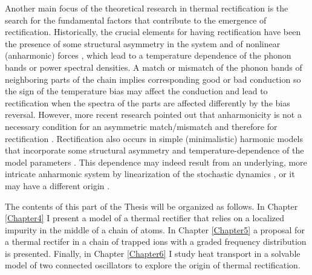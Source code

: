 Another main focus of the theoretical research in thermal rectification is the search for the fundamental factors that contribute to the emergence of rectification. Historically, the crucial elements for having rectification have been the presence of some structural asymmetry in the system and of nonlinear (anharmonic) forces \cite{Zeng2008,Katz2016,Li2008,Hu2006,Benenti2016,Li2012,Segal2005,Segal2005b}, which lead to a temperature dependence of the phonon bands or power spectral densities. A match or mismatch of the phonon bands of neighboring parts of the chain implies corresponding good or bad conduction so the
sign of the temperature bias may affect the conduction and lead to rectification when the spectra of the parts are affected differently by the bias reversal. However, more recent research pointed out that anharmonicity is not a necessary condition for an asymmetric match/mismatch and therefore for rectification \cite{Pereira2017}. Rectification also occurs in simple (minimalistic) harmonic models that incorporate some structural asymmetry and temperature-dependence of the model parameters \cite{Pereira2017}. This dependence may indeed result from an underlying, more intricate  anharmonic system by linearization of the stochastic dynamics \cite{Pereira2017,Pereira2019}, or it may have a different origin \cite{Simon2019}.


The contents of this part of the Thesis will be organized as follows. In Chapter \ref{Chapter4} I present a model of a thermal rectifier that relies on a localized impurity in the middle of a chain of atoms. In Chapter \ref{Chapter5} a proposal for a thermal rectifer in a chain of trapped ions with a graded frequency distribution is presented. Finally, in Chapter \ref{Chapter6} I study heat transport in a solvable model of two connected oscillators to explore the origin of thermal rectification.
